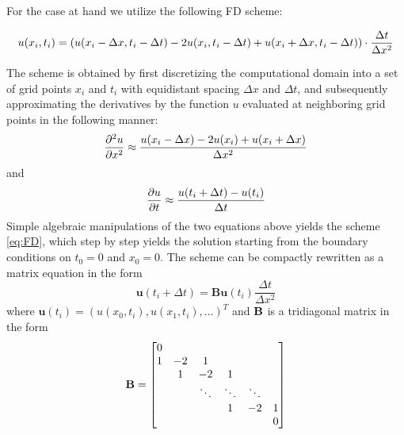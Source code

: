 \documentclass[reprint, english, nofootinbib]{revtex4-2}
\begin{document}
For the case at hand we utilize the following FD scheme:
\begin{widetext}
\begin{equation}
\label{eq:FD}
    u(x_i,t_i) = \qty(u(x_i - \Delta x,t_i - \Delta t) - 
                 2u(x_i,t_i-\Delta t) + 
                 u(x_i+\Delta x,t_i-\Delta t)) \cdot \frac{\Delta t}{\Delta x^2} 
\end{equation}
\end{widetext}
The scheme is obtained by first discretizing the computational domain into a set of grid points $x_i$ and $t_i$ with equidistant spacing $\Delta x$ and $\Delta t$, and subsequently approximating the derivatives by the function $u$ evaluated at neighboring grid points in the following manner:
\begin{equation}
   \pdv[2]{u}{x} \approx \frac{u(x_i-\Delta x)-2u(x_i) + u(x_i+\Delta x)}{\Delta x^2} 
\end{equation}
and
\begin{equation}
    \pdv{u}{t} \approx \frac{u(t_i + \Delta t) - u(t_{i})}{\Delta t}
\end{equation}
Simple algebraic manipulations of the two equations above yields the scheme \ref{eq:FD}, which step by step yields the solution starting from the boundary conditions on $t_0 = 0$ and $x_0 = 0$. The scheme can be compactly rewritten as a matrix equation in the form
\begin{equation}
    \pmb u(t_i+\Delta t) = \mathbf{B} \pmb u(t_i) \frac{\Delta t}{\Delta x^2}
\end{equation}
where $\pmb u(t_i) = (u(x_0, t_i), u(x_1, t_i), \dots)^T$ and $\bf B$ is a tridiagonal matrix in the form
\begin{equation} \label{eqn: Az = b}
    \mathbf B = \qty[
    \begin{matrix}
    0 \\
    1 & -2 & 1 \\
    & 1 & -2 & 1 \\
    && \ddots & \ddots & \ddots \\
    &&& 1 & -2 & 1 \\
    &&&&& 0
    \end{matrix}
    ]
 \end{equation}
\end{document}
